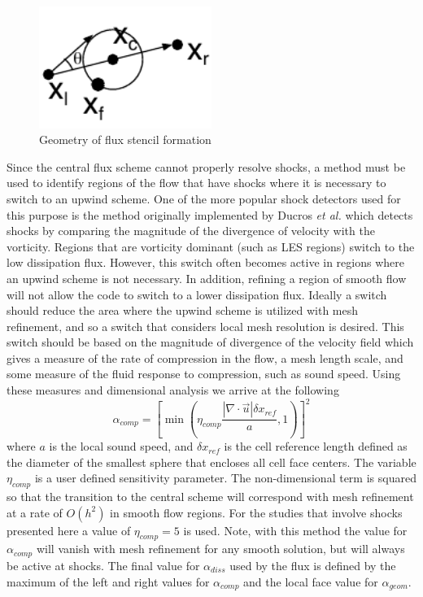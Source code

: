 \begin{figure}[h]
\begin{center}
\includegraphics[width=0.5\textwidth]{Figures/geom_test}
\caption{Geometry of flux stencil formation}
\label{fig:stencilangle}
\end{center}
\end{figure}

Since the central flux scheme cannot properly resolve shocks, a method
must be used to identify regions of the flow that have shocks where it
is necessary to switch to an upwind scheme.  One of the more popular
shock detectors used for this purpose is the method originally
implemented by Ducros {\it et al.}\cite{Ducros.2000} which detects
shocks by comparing the magnitude of the divergence of velocity with
the vorticity.  Regions that are vorticity dominant (such as LES
regions) switch to the low dissipation flux.  However, this switch
often becomes active in regions where an upwind scheme is not
necessary.  In addition, refining a region of smooth flow will not
allow the code to switch to a lower dissipation flux.  Ideally a
switch should reduce the area where the upwind scheme is utilized with
mesh refinement, and so a switch that considers local mesh resolution
is desired.  This switch should be based on the magnitude of
divergence of the velocity field which gives a measure of the
rate of compression in the flow, a mesh length scale, and some measure of
the fluid response to compression, such as sound speed.  Using these
measures and dimensional analysis we arrive at the following
\begin{equation}
\alpha_{comp} = \left[\min\left(\eta_{comp}\frac{\left| \nabla \cdot
        \vec{u} \right| \delta x_{ref}}{a },1\right)\right]^2
\label{eq:alphacomp}
\end{equation}
where $a$ is the local sound speed, and $\delta x_{ref}$ is the cell
reference length defined as the diameter of the smallest sphere that
encloses all cell face centers.  The variable $\eta_{comp}$ is a user
defined sensitivity parameter.  The non-dimensional term is squared so
that the transition to the central scheme will correspond with mesh
refinement at a rate of $O(h^2)$ in smooth flow regions.  For the
studies that involve shocks presented here a value of $\eta_{comp} =
5$ is used.  Note, with this method the value for $\alpha_{comp}$ will
vanish with mesh refinement for any smooth solution, but will always
be active at shocks.  The final value for $\alpha_{diss}$ used by the
flux is defined by the maximum of the left and right values for
$\alpha_{comp}$ and the local face value for $\alpha_{geom}$.
